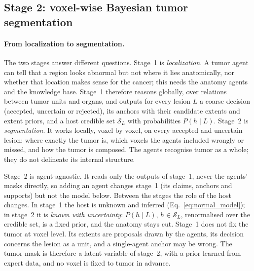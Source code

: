 \documentclass[fleqn,10pt]{olplainarticle}
\begin{document}
\subsection{Stage 2: voxel-wise Bayesian tumor segmentation}
\label{sec:stage2}

\paragraph{From localization to segmentation.} The two stages answer different questions. Stage~1 is \emph{localization}.
A tumor agent can tell that a region looks abnormal but not where it lies anatomically, nor whether that location makes
sense for the cancer; this needs the anatomy agents and the knowledge base. Stage~1 therefore reasons globally, over
relations between tumor units and organs, and outputs for every lesion $L$ a coarse decision (accepted, uncertain or
rejected), its anchors with their candidate extents and extent priors, and a host credible set $\mathcal{S}_L$ with
probabilities $P(h\mid L)$. Stage~2 is \emph{segmentation}. It works locally, voxel by voxel, on every accepted and uncertain
lesion: where exactly the tumor is, which voxels the agents included wrongly or missed, and how the tumor is composed. The
agents recognise tumor as a whole; they do not delineate its internal structure.

Stage~2 is agent-agnostic. It reads only the outputs of stage~1, never the agents' masks directly, so adding an agent changes
stage~1 (its claims, anchors and supports) but not the model below. Between the stages the role of the host changes. In
stage~1 the host is unknown and inferred (Eq.~\eqref{eq:normal_model}); in stage~2 it is \emph{known with uncertainty}:
$P(h\mid L)$, $h\in\mathcal{S}_L$, renormalised over the credible set, is a fixed prior, and the anatomy stays cut. Stage~1 does
not fix the tumor at voxel level. Its extents are proposals drawn by the agents, its decision concerns the lesion as a unit,
and a single-agent anchor may be wrong. The tumor mask is therefore a latent variable of stage~2, with a prior learned from
expert data, and no voxel is fixed to tumor in advance.
\end{document}
